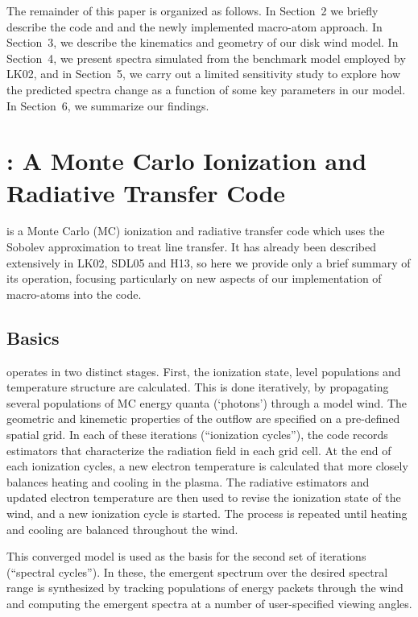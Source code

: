 \documentclass[preprint, a4paper, 11pt]{aastex}
\begin{document}
The remainder of this paper is organized as follows. In Section~2 we
briefly describe the code and and the newly implemented macro-atom
approach. In Section~3, we describe the kinematics and geometry of our
disk wind model. 
In Section~4, we present spectra simulated from the benchmark model
employed by LK02, and in Section~5, we carry out a limited sensitivity
study to explore how the predicted spectra change as a function of
some key parameters in our model. In Section~6, we summarize our
findings.


%
%

\section{: A Monte Carlo Ionization and Radiative Transfer Code}

\py is a Monte Carlo (MC) ionization and radiative transfer code which
uses the Sobolev approximation to treat line transfer. It has already
been described extensively in LK02, SDL05 and H13, so here we provide
only a brief summary of its operation, focusing particularly on new
aspects of our implementation of macro-atoms into the code. 

\subsection{Basics} 

\py operates in two distinct stages. First, the ionization state,
level populations and temperature structure are calculated. This is
done iteratively, by 
propagating several populations of MC energy quanta (`photons')
through a model wind. The geometric and kinemetic properties of the
outflow are specified on a pre-defined spatial grid. In each of these
iterations (``ionization cycles''), the code records estimators that 
characterize the radiation field in each grid cell. At the end 
of each ionization cycles, a new electron temperature is calculated
that more closely balances heating and cooling in the 
plasma. The radiative estimators and updated electron
temperature are then used to revise the ionization state of the wind,
and a new ionization cycle is started. The process is repeated until
heating and cooling are balanced throughout the wind. 

This converged model is used as the basis for the second set of
iterations (``spectral cycles''). In these, the emergent spectrum over
the desired spectral range is synthesized by tracking populations of
energy packets through the wind and computing the emergent spectra at
a number of user-specified viewing angles.  
\end{document}

